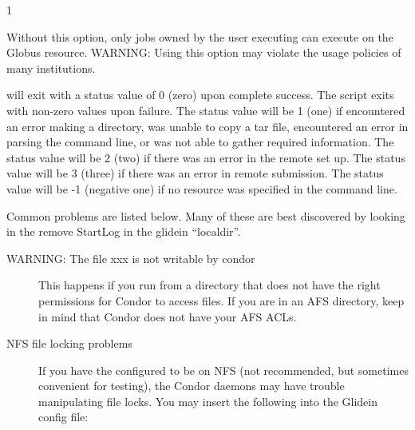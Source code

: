 \begin{ManPage}{\label{man-condor-glidein}}{1}
\begin{Options}
{	Without this option, only jobs owned by the user executing
	 can execute on the Globus resource. WARNING:
	Using this option may violate the usage policies of many
	institutions.
	}

\end{Options}

\ExitStatus

 will exit with a status value of 0 (zero) upon 
complete success.
The script exits with non-zero values upon failure.
The status value will be 1 (one) if 
 encountered an error making a directory,
was unable to copy a tar file,
encountered an error in parsing the command line,
or was not able to gather required information.
The status value will be 2 (two) if 
there was an error in the remote set up.
The status value will be 3 (three) if 
there was an error in remote submission.
The status value will be -1 (negative one) if 
no resource was specified in the command line.

Common problems are listed below.  Many of these are best discovered by
looking in the remove StartLog in the glidein ``localdir''.

\begin{description}

\item[WARNING: The file xxx is not writable by condor]  This happens if you
run  from a directory that does not have the right
permissions for Condor to access files.  If you are in an AFS directory,
keep in mind that Condor does not have your AFS ACLs.

\item[NFS file locking problems]  If you have the 
configured to be on NFS (not recommended, but sometimes convenient
for testing), the Condor daemons may have trouble manipulating file
locks.  You may insert the following into the Glidein config file:


\end{description}
\end{ManPage}
